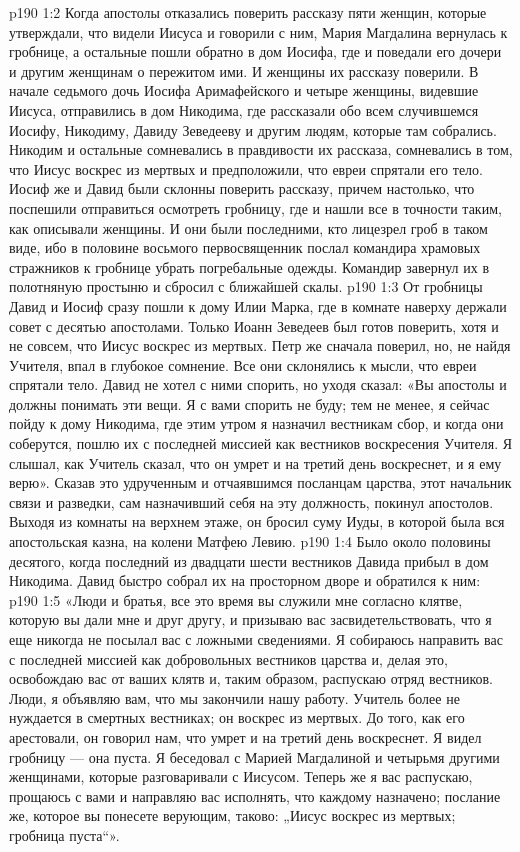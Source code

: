 \vs p190 1:2 Когда апостолы отказались поверить рассказу пяти женщин, которые утверждали, что видели Иисуса и говорили с ним, Мария Магдалина вернулась к гробнице, а остальные пошли обратно в дом Иосифа, где и поведали его дочери и другим женщинам о пережитом ими. И женщины их рассказу поверили. В начале седьмого дочь Иосифа Аримафейского и четыре женщины, видевшие Иисуса, отправились в дом Никодима, где рассказали обо всем случившемся Иосифу, Никодиму, Давиду Зеведееву и другим людям, которые там собрались. Никодим и остальные сомневались в правдивости их рассказа, сомневались в том, что Иисус воскрес из мертвых и предположили, что евреи спрятали его тело. Иосиф же и Давид были склонны поверить рассказу, причем настолько, что поспешили отправиться осмотреть гробницу, где и нашли все в точности таким, как описывали женщины. И они были последними, кто лицезрел гроб в таком виде, ибо в половине восьмого первосвященник послал командира храмовых стражников к гробнице убрать погребальные одежды. Командир завернул их в полотняную простыню и сбросил с ближайшей скалы.
\vs p190 1:3 От гробницы Давид и Иосиф сразу пошли к дому Илии Марка, где в комнате наверху держали совет с десятью апостолами. Только Иоанн Зеведеев был готов поверить, хотя и не совсем, что Иисус воскрес из мертвых. Петр же сначала поверил, но, не найдя Учителя, впал в глубокое сомнение. Все они склонялись к мысли, что евреи спрятали тело. Давид не хотел с ними спорить, но уходя сказал: «Вы апостолы и должны понимать эти вещи. Я с вами спорить не буду; тем не менее, я сейчас пойду к дому Никодима, где этим утром я назначил вестникам сбор, и когда они соберутся, пошлю их с последней миссией как вестников воскресения Учителя. Я слышал, как Учитель сказал, что он умрет и на третий день воскреснет, и я ему верю». Сказав это удрученным и отчаявшимся посланцам царства, этот начальник связи и разведки, сам назначивший себя на эту должность, покинул апостолов. Выходя из комнаты на верхнем этаже, он бросил суму Иуды, в которой была вся апостольская казна, на колени Матфею Левию.
\vs p190 1:4 Было около половины десятого, когда последний из двадцати шести вестников Давида прибыл в дом Никодима. Давид быстро собрал их на просторном дворе и обратился к ним:
\vs p190 1:5 \pc «Люди и братья, все это время вы служили мне согласно клятве, которую вы дали мне и друг другу, и призываю вас засвидетельствовать, что я еще никогда не посылал вас с ложными сведениями. Я собираюсь направить вас с последней миссией как добровольных вестников царства и, делая это, освобождаю вас от ваших клятв и, таким образом, распускаю отряд вестников. Люди, я объявляю вам, что мы закончили нашу работу. Учитель более не нуждается в смертных вестниках; он воскрес из мертвых. До того, как его арестовали, он говорил нам, что умрет и на третий день воскреснет. Я видел гробницу --- она пуста. Я беседовал с Марией Магдалиной и четырьмя другими женщинами, которые разговаривали с Иисусом. Теперь же я вас распускаю, прощаюсь с вами и направляю вас исполнять, что каждому назначено; послание же, которое вы понесете верующим, таково: „Иисус воскрес из мертвых; гробница пуста“».
